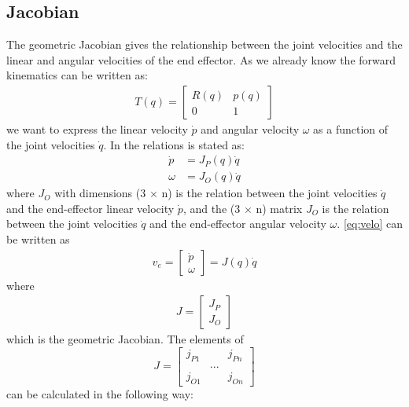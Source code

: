 \subsection{Jacobian}
The geometric Jacobian gives the relationship between the joint velocities and the linear and angular velocities of the end effector\cite{Siciliano}\cite{spong}. As we already know the forward kinematics can be written as:
\begin{align*}
    T(q) = 
    \begin{bmatrix}
        R(q) & p(q)\\
        0 & 1
    \end{bmatrix}
\end{align*}
we want to express the linear velocity $\dot{p}$ and angular velocity $\omega$ as a function of the joint velocities $\dot{q}$. In \cite{Siciliano} the relations is stated as:
\begin{equation}
    \begin{aligned}\label{eq:velo}
        \dot{p} &= J_P(q)\dot{q}\\
        \omega&= J_O(q)\dot{q}
    \end{aligned}
\end{equation}
where $J_O$ with dimensions (3 $\times$ n) is the relation between the joint velocities $\dot{q}$ and the end-effector linear velocity $\dot{p}$, and the (3 $\times$ n) matrix $J_O$ is the relation between the joint velocities $\dot{q}$ and the end-effector angular velocity $\omega$. \eqref{eq:velo} can be written as
\begin{align*}
    v_e = 
    \begin{bmatrix}
        \dot{p} \\ \omega
    \end{bmatrix}
    = J(q)\dot{q}
\end{align*}
where
\begin{align*}
    J = 
    \begin{bmatrix}
        J_P \\ J_O
    \end{bmatrix}
\end{align*}
which is the geometric Jacobian. The elements of 
$$
J = 
\begin{bmatrix}
    j_{P1} & & j_{Pn}\\
    &...&\\
    j_{O1} & & j_{On}
\end{bmatrix}
$$
can be calculated in the following way:
